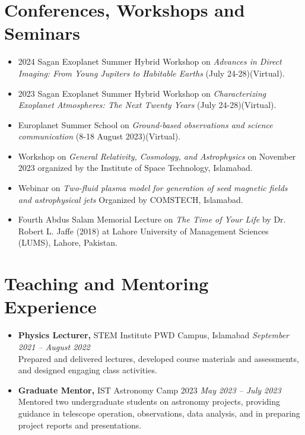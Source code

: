 \documentclass{article}
\begin{document}
\section*{Conferences, Workshops and Seminars}
\vspace{-\baselineskip}
\noindent\makebox[\linewidth]{\rule{\textwidth}{0.4pt}}
\begin{itemize}
    \item 2024 Sagan Exoplanet Summer Hybrid Workshop on \textit{Advances in Direct Imaging: From Young Jupiters to Habitable Earths} (July 24-28)(Virtual).
    \item 2023 Sagan Exoplanet Summer Hybrid Workshop on \textit{Characterizing Exoplanet Atmospheres: The Next Twenty Years} (July 24-28)(Virtual).
    \item Europlanet Summer School on \textit{Ground-based observations and science communication} (8-18 August 2023)(Virtual).
    \item Workshop on \textit{General Relativity, Cosmology, and Astrophysics} on November 2023 organized by the Institute of Space Technology, Islamabad.
    \item Webinar on \textit{Two-fluid plasma model for generation of seed magnetic fields and astrophysical jets} Organized by COMSTECH, Islamabad.
    \item Fourth Abdus Salam Memorial Lecture on \textit{The Time of Your Life} by Dr. Robert L. Jaffe (2018) at Lahore University of Management Sciences (LUMS), Lahore, Pakistan.
\end{itemize}

\section*{Teaching and Mentoring Experience}
\vspace{-\baselineskip}
\noindent\makebox[\linewidth]{\rule{\textwidth}{0.4pt}}
\begin{itemize}
    \item \textbf{Physics Lecturer,} STEM Institute PWD Campus, Islamabad \hfill \textit{September 2021 -- August 2022} \\
     Prepared and delivered lectures, developed course materials and assessments, and designed engaging class activities.
    \item \textbf{Graduate Mentor,} IST Astronomy Camp 2023 \hfill
    \textit{May 2023 -- July 2023} \\
    Mentored two undergraduate students on astronomy projects, providing guidance in telescope operation, observations, data analysis, and in preparing project reports and presentations.
\end{itemize}
\end{document}
